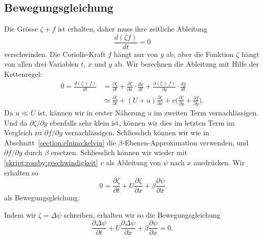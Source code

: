 \subsection{Bewegungsgleichung\label{subsection:rossby:bewegungsgleichung}}
Die Grösse $\zeta+f$ ist erhalten, daher muss ihre zeitliche Ableitung
\[
\frac{d(\zeta f)}{dt}=0
\]
verschwinden.
Die Coriolis-Kraft
$f$ hängt nur von $y$ ab, aber die Funktion $\zeta$ hängt von allen
drei Variablen $t$, $x$ und $y$ ab.
Wir berechnen die Ableitung mit Hilfe der Kettenregel:
\begin{align*}
0
=
\frac{d(\zeta+f)}{dt}
&=
\frac{\partial\zeta}{\partial t}
+
\frac{\partial\zeta}{\partial x}\cdot \frac{dx}{dt}
+
\frac{\partial(\zeta+f)}{\partial y}\cdot\frac{dy}{dt}
\\
&\simeq
\frac{\partial\zeta}{\partial t}
+
(U+u)\frac{\partial\zeta}{\partial x}
+
v\biggl(\frac{\partial\zeta}{\partial y} + \frac{\partial f}{\partial y}\biggr).
\end{align*}
Da $u\ll U$ ist, kännen wir in erster Näherung $u$ im zweiten Term 
vernachlässigen.
Und da $\partial\zeta/\partial y$ ebenfalls sehr klein ist, können
wir dies im letzten Term im Vergleich zu $\partial f/\partial y$
vernachlässigen.
Schliesslich können wir wie in Abschnitt~\ref{section:elnino:kelvin}
die $\beta$-Ebenen-Approximation verwenden, und $\partial f/\partial y$
durch $\beta$ ersetzen.
Schliesslich können wir wieder mit \eqref{skript:rossby:geschwindigkeit}
$v$ als Ableitung von $\psi$ nach $x$ ausdrücken.
Wir erhalten so
\[
0
=
\frac{\partial\zeta}{\partial t}
+
U\frac{\partial\zeta}{\partial x}
+
\beta\frac{\partial\psi}{\partial x}
\]
als Bewegungsgleichung.

Indem wir $\zeta=\Delta \psi$ schreiben, erhalten wir so die 
Bewegungsgleichung
\begin{equation}
\frac{\partial\Delta\psi}{\partial t}
+
U\frac{\partial\Delta\psi}{\partial x}
+
\beta\frac{\partial\psi}{\partial x}
=
0.
\label{rossby:gleichung}
\end{equation}


